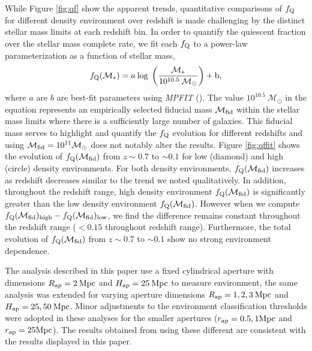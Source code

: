 \documentclass{emulateapj}
\begin{document}
While Figure \ref{fig:qf} show the apparent trends, quantitative comparisons of $f_{\rm{Q}}$ for different density environment over redshift is made challenging by the distinct stellar mass limits at each redshift bin. In order to quantify the quiescent fraction over the stellar mass complete rate, we fit each $f_{\rm{Q}}$ to a power-law parameterization as a function of stellar mass, 
\begin{equation} 
f_{\rm{Q}}(\mathcal{M}_{*}) = a \: \rm{log} \; \left(\frac{ \mathcal{M}_{*}}{10^{10.5} \: \mathcal{M}_{\odot}} \right)+b,
\end{equation}
where $a$ are $b$ are best-fit parameters using {\em MPFIT} (\cite{Markwardt:2009aa}). The value $10^{10.5} \: \mathcal{M}_{\odot}$ in the equation represents an empirically selected fiducial mass $\mathcal{M}_{\rm{fid}}$ within the stellar mass limits where there is a sufficiently large number of galaxies. This fiducial mass serves to highlight and quantify the $f_{\rm{Q}}$ evolution for different redshifts and using $\mathcal{M}_{\rm{fid}} = 10^{11} \mathcal{M}_\odot$ does not notably alter the results. Figure \ref{fig:qffit} shows the evolution of $f_{\rm{Q}}(\mathcal{M}_{\rm{fid}})$ from $z \sim 0.7$ to $\sim 0.1$ for low (diamond) and high (circle) density environments. For both density environments, $f_{\rm{Q}}(\mathcal{M}_{\rm{fid}})$ increases as redshift decreases similar to the trend we noted qualitatively. In addition, throughout the redshift range, high density environment $f_{\rm{Q}}(\mathcal{M}_{\rm{fid}})$ is significantly greater than the low density environment $f_{\rm{Q}}(\mathcal{M}_{\rm{fid}})$. However when we compute $f_{\rm{Q}}(\mathcal{M}_{\rm{fid}})_{\rm{high}} - f_{\rm{Q}}(\mathcal{M}_{\rm{fid}})_{\rm{low}}$, we find the difference remains constant throughout the redshift range ($ < 0.15$ throughout redshift range). Furthermore, the total evolution of $f_{\rm{Q}}(\mathcal{M}_{\rm{fid}})$ from $z \sim 0.7$ to $\sim 0.1$ show no strong environment dependence. 

The analysis described in this paper use a fixed cylindrical aperture with dimensions $R_{\rm{ap}} = 2 \: \rm{Mpc}$ and $H_{\rm{ap}} = 25 \: \rm{Mpc}$ to measure environment, the same analysis was extended for varying aperture dimensions $R_{\rm{ap}} = 1, 2, 3 \: \rm{Mpc}$ and $H_{\rm{ap}} = 25, 50 \: \rm{Mpc}$. Minor adjustments to the environment classification thresholds were adopted in these analyses for the smaller apertures ($r_{\rm{ap}} = 0.5, 1 \rm{Mpc}$ and $r_{\rm{ap}} = 25 \rm{Mpc}$). The results obtained from using these different are consistent with the results displayed in this paper. 
\end{document}
